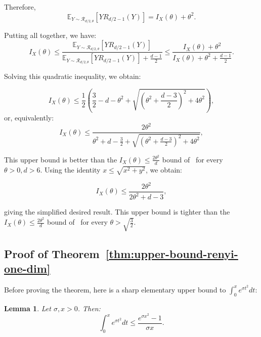 \documentclass{article}
\theoremstyle{plain}
\newtheorem{lemma}{Lemma}[section]
\theoremstyle{definition}
\theoremstyle{remark}
\begin{document}
Therefore,
\[\mathbb{E}_{Y \sim \mathcal{R}_{d/2,\theta}}[Y R_{d/2-1}(Y)] = I_X(\theta) + \theta^2.\]

Putting all together, we have:
\[I_X(\theta) \leq \frac{\mathbb{E}_{Y \sim \mathcal{R}_{d/2,\theta}}\left[Y R_{d/2-1}(Y)\right]}{\mathbb{E}_{Y \sim \mathcal{R}_{d/2,\theta}}\left[Y R_{d/2-1}(Y)\right] + \frac{d-1}{2}} \leq \frac{I_X(\theta) + \theta^2}{I_X(\theta) + \theta^2 + \frac{d-1}{2}}.\]

Solving this quadratic inequality, we obtain:

\[I_X(\theta) \leq \frac{1}{2}\left(\frac{3}{2}- d - \theta^2 + \sqrt{\left(\theta^2 + \frac{d-3}{2}\right)^2 + 4\theta^2}\right),\]
or, equivalently:
\[I_X(\theta) \leq \frac{2\theta^2}{\theta^2 + d -\frac{3}{2} + \sqrt{\left(\theta^2 + \frac{d-3}{2}\right)^2 + 4\theta^2}},\]

This upper bound is better than the $I_X(\theta) \leq \frac{2\theta^2}{d}$ bound of~\citet{Idier2014} for every $\theta > 0,d > 6$.
Using the identity $x \leq \sqrt{x^2 + y^2}$, we obtain:

\[I_X(\theta) \leq \frac{2\theta^2}{2\theta^2 + d-3},\]

giving the simplified desired result. This upper bound is tighter than the $I_X(\theta) \leq \frac{2\theta^2}{d}$ bound of~\citet{Idier2014} for every $\theta > \sqrt{\frac{3}{2}}$.
\subsection{Proof of Theorem~\ref{thm:upper-bound-renyi-one-dim}}

Before proving the theorem, here is a sharp elementary upper bound to $\int_0^x e^{\sigma t^2} dt$:
\begin{lemma}
\label{lem:gauss-simple-bound}
    Let $\sigma, x > 0$. Then:
    \[\int_0^x e^{\sigma t^2} dt \leq \frac{e^{\sigma x^2}-  1}{\sigma x}.\]
\end{lemma}

\thmUpperBoundRenyiOneDim*
\end{document}
